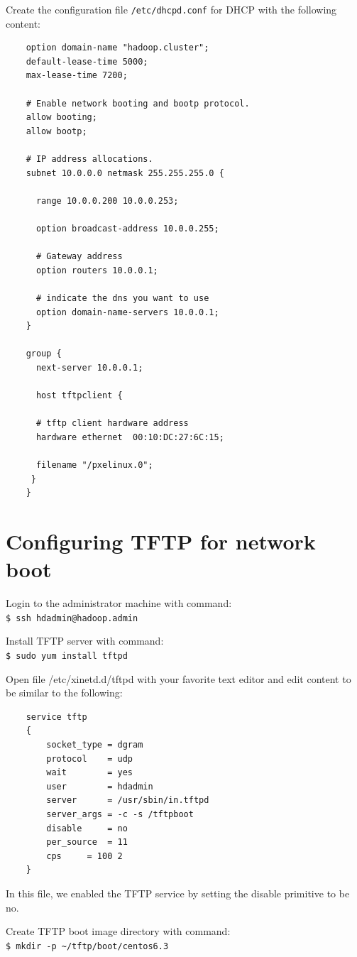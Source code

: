 Create the configuration file \verb|/etc/dhcpd.conf| for DHCP with the following content:
\lstset{style=bashstyle}
\begin{lstlisting}
    option domain-name "hadoop.cluster";
    default-lease-time 5000;
    max-lease-time 7200;

    # Enable network booting and bootp protocol.
    allow booting;
    allow bootp;

    # IP address allocations.
    subnet 10.0.0.0 netmask 255.255.255.0 {

      range 10.0.0.200 10.0.0.253;

      option broadcast-address 10.0.0.255;

      # Gateway address
      option routers 10.0.0.1;

      # indicate the dns you want to use
      option domain-name-servers 10.0.0.1;
    }

    group {
      next-server 10.0.0.1;

      host tftpclient {

      # tftp client hardware address
      hardware ethernet  00:10:DC:27:6C:15;

      filename "/pxelinux.0";
     }
    }
\end{lstlisting}

\section{Configuring TFTP for network boot}
Login to the administrator machine with command: \\
\verb|$ ssh hdadmin@hadoop.admin|

Install TFTP server with command: \\
\verb|$ sudo yum install tftpd|

Open file /etc/xinetd.d/tftpd with your favorite text editor and edit content to be similar to the following:
\lstset{style=bashstyle}
\begin{lstlisting}
    service tftp
    {
    	socket_type	= dgram
    	protocol	= udp
    	wait		= yes
    	user		= hdadmin
    	server		= /usr/sbin/in.tftpd
    	server_args	= -c -s /tftpboot
    	disable		= no
    	per_source	= 11
    	cps		= 100 2
    }
\end{lstlisting}
In this file, we enabled the TFTP service by setting the disable primitive to be no.

Create TFTP boot image directory with command: \\
\verb|$ mkdir -p ~/tftp/boot/centos6.3|

